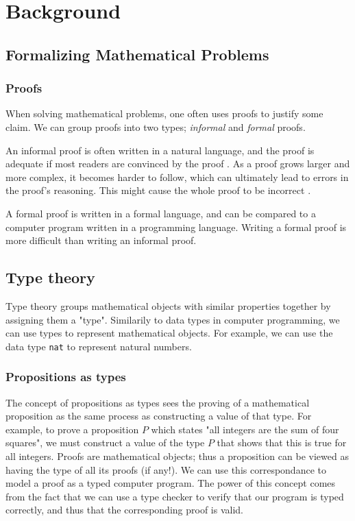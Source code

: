 \chapter{Background}

\section{Formalizing Mathematical Problems}

\subsection{Proofs}

When solving mathematical problems, one often uses proofs
to justify some claim. We can group proofs into two types; \textit{informal} and \textit{formal} proofs.

An informal proof is often written in a natural language, and the proof is adequate if most
readers are convinced by the proof \cite{bpierce}.
As a proof grows larger and more complex, it becomes harder to follow, which can
ultimately lead to errors in the proof's reasoning. This might cause the whole proof
to be incorrect \cite{rkhamsi}.

A formal proof is written in a formal language, and can be compared to a computer program
written in a programming language. Writing a formal proof is more difficult than writing an informal proof.

\section{Type theory}

Type theory groups mathematical objects with similar properties together by assigning them a "type".
Similarily to data types in computer programming, we can use types to represent mathematical
objects. For example, we can use the data type \texttt{nat} to represent natural numbers.

\subsection{Propositions as types}
The concept of propositions as types sees the proving of a mathematical proposition
as the same process as constructing a value of that type.
For example, to prove a proposition $P$ which states "all integers are the sum of four squares",
we must construct a value of the type $P$ that shows that this is true for all integers.
Proofs are mathematical objects; thus a proposition can be viewed as having the type of all its proofs (if any!).
We can use this correspondance to model a proof as a typed computer program.
The power of this concept comes from the fact that we can use a type checker to verify that
our program is typed correctly, and thus that the corresponding proof is valid.


